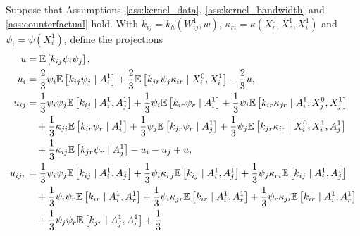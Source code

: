 \begin{lemma}
  \label{lem:counterfactual_hoeffding}

  Suppose that Assumptions~\ref{ass:kernel_data},
  \ref{ass:kernel_bandwidth} and
  \ref{ass:counterfactual} hold.
  With $k_{ij} = k_h(W_{ij}^1, w)$,
  $\kappa_{r i} = \kappa(X_r^0, X_r^1, X_i^1)$
  and $\psi_i = \psi(X_i^1)$, define the projections
  \begin{align*}
    u
    &=
    \E\left[
      k_{ij}
      \psi_i
      \psi_j
    \right], \\
    u_i
    &=
    \frac{2}{3} \psi_i
    \E\left[
      k_{ij}
      \psi_j
      \mid A_i^1 \right]
    +
    \frac{2}{3} \E\left[
      k_{jr}
      \psi_j \kappa_{ir}
      \mid X_i^0, X_i^1 \right]
    - \frac{2}{3} u, \\
    u_{ij}
    &=
    \frac{1}{3}
    \psi_i
    \psi_j
    \E\left[
      k_{ij}
      \mid A_i^1, A_j^1 \right]
    +
    \frac{1}{3}
    \psi_i
    \E\left[
      k_{ir} \psi_r
      \mid A_i^1 \right]
    +
    \frac{1}{3}
    \psi_i
    \E\left[
      k_{ir}  \kappa_{jr}
      \mid A_i^1, X_j^0, X_j^1 \right] \\
    &\quad+
    \frac{1}{3}
    \kappa_{ji}
    \E\left[
      k_{ir} \psi_r
    \mid A_i^1 \right]
    + \frac{1}{3}
    \psi_j
    \E\left[
      k_{jr}  \psi_r
      \mid A_j^1 \right]
    +
    \frac{1}{3}
    \psi_j
    \E\left[
      k_{jr}  \kappa_{ir}
      \mid X_i^0, X_i^1, A_j^1 \right] \\
    &\quad+
    \frac{1}{3}
    \kappa_{ij}
    \E\left[
      k_{jr} \psi_r
      \mid A_j^1 \right]
    - u_i - u_j + u, \\
    u_{ijr}
    &=
    \frac{1}{3}
    \psi_i \psi_j
    \E\left[
      k_{ij}
      \mid A_i^1, A_j^1 \right]
    +
    \frac{1}{3}
    \psi_i \kappa_{r j}
    \E\left[
      k_{ij}
      \mid A_i^1, A_j^1 \right]
    +
    \frac{1}{3}
    \psi_j \kappa_{r i}
    \E\left[
      k_{ij}
      \mid A_i^1, A_j^1 \right] \\
    &\quad+
    \frac{1}{3}
    \psi_i \psi_r
    \E\left[
      k_{ir}
      \mid A_i^1, A_r^1 \right]
    + \frac{1}{3}
    \psi_i \kappa_{jr}
    \E\left[
      k_{ir}
      \mid A_i^1, A_r^1 \right]
    +
    \frac{1}{3}
    \psi_r \kappa_{ji}
    \E\left[
      k_{ir}
      \mid A_i^1, A_r^1 \right] \\
    &\quad+
    \frac{1}{3}
    \psi_j \psi_r
    \E\left[
      k_{jr}
      \mid A_j^1, A_r^1 \right]
    + \frac{1}{3}

\end{align*}
\end{lemma}
